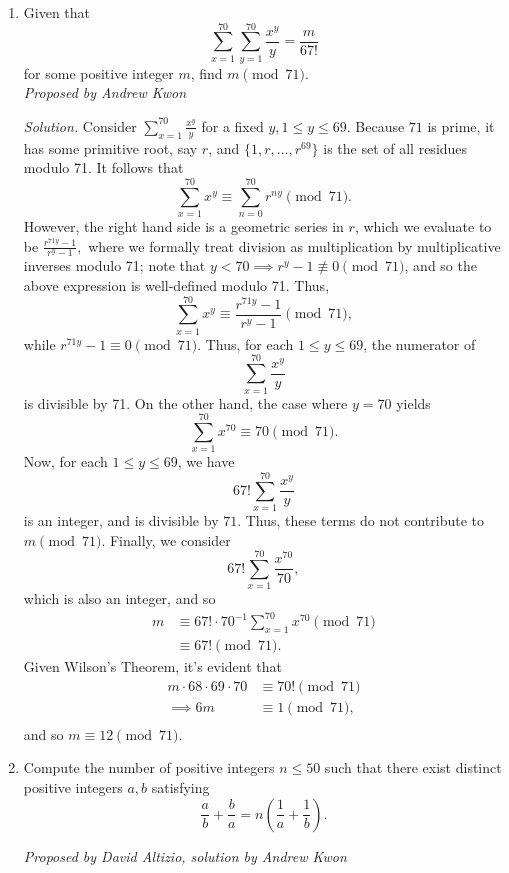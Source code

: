 \documentclass[10pt]{article}
\newcommand{\proposed}[1]
{
\vspace{5pt}
\noindent\textit{Proposed by #1}
}
\newcommand{\solution}
{
\vspace{5pt}
\noindent\textit{Solution.}\qquad
}
\begin{document}
\begin{enumerate}
\item Given that
	\[
		\sum_{x=1}^{70}  \sum_{y=1}^{70} \frac{x^{y}}{y} =
		\frac{m}{67!}
	\]
	for some positive integer $m$, find $m \pmod{71}$.\\

\proposed{Andrew Kwon}

\solution Consider $\displaystyle \sum_{x=1}^{70} \frac{x^{y}}{y}$ for a fixed
$y, 1 \leq y \leq 69.$ Because $71$ is prime, it has some primitive root,
say $r$, and $\{1,r, \ldots, r^{69}\}$ is the set of all residues modulo 71.
It follows that 
	\[
	\sum_{x=1}^{70} x^{y} \equiv \sum_{n=0}^{70} r^{ny} \pmod{71}.
	\]
	However, the right hand side is a geometric series in $r$, which we
	evaluate to be $\displaystyle \frac{r^{71y}-1}{r^{y}-1},$ where we formally
	treat division as multiplication by multiplicative inverses modulo
	71; note that $y<70\implies r^{y}-1 \not\equiv 0 \pmod{71}$, and
	so the above expression is well-defined modulo 71. Thus,
	\[
		\sum_{x=1}^{70} x^{y} \equiv 
		\frac{r^{71y}-1}{r^{y}-1} \pmod{71},
	\]
	while $r^{71y}-1 \equiv 0 \pmod{71}$. Thus, for each $1 \leq y \leq
	69$, the numerator of 
	\[
		\sum_{x=1}^{70} \frac{x^{y}}{y}
	\]
	is divisible by 71. On the other hand, the case where $y = 70$
	yields
	\[
		\sum_{x=1}^{70} x^{70} \equiv 70\pmod{71}.
	\]
	Now, for each $1 \leq y \leq 69$, we have
	\[
		67! \sum_{x=1}^{70} \frac{x^{y}}{y}
	\]
	is an integer, and is divisible by $71$. Thus, these terms do not
	contribute to $m \pmod{71}$. Finally, we consider 
	\[
		67! \sum_{x=1}^{70} \frac{x^{70}}{70},
	\]
	which is also an integer, and so
	\begin{align*}
		m &\equiv 67! \cdot 70^{-1} \sum_{x=1}^{70} x^{70} \pmod{71}\\
		&\equiv 67! \pmod{71}.
	\end{align*}
	Given Wilson's Theorem, it's evident that 
	\begin{align*}
		m \cdot  68 \cdot 69 \cdot 70 &\equiv 70! \pmod{71}\\
		\implies 6m &\equiv 1 \pmod{71},\\
	\end{align*}
	and so $m \equiv \boxed{12} \pmod{71}$.


\item Compute the number of positive integers $n \leq 50$ such that there exist
	distinct positive integers $a,b$ satisfying 
	\[
		\frac{a}{b} +\frac{b}{a} = n \left(\frac{1}{a} + \frac{1}{b}\right).
	\]
	\proposed{David Altizio, solution by Andrew Kwon}


\end{enumerate}
\end{document}
